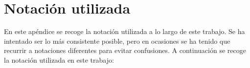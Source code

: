\chapter*{Notación utilizada}


En este apéndice se recoge la notación utilizada a lo largo de este trabajo. Se ha intentado ser lo más consistente posible, pero en ocasiones se ha tenido que recurrir a notaciones diferentes para evitar confusiones. A continuación se recoge la notación utilizada en este trabajo: